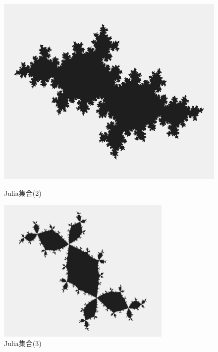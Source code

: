 \documentclass[dvipdfmx]{jsarticle}
\theoremstyle{definition}
\begin{document}
\begin{figure}[H]
    \begin{minipage}{0.49\hsize}
        \centering
        \includegraphics[scale=0.21]{figure/others/set/julia_set2.png}
        \caption{Julia集合(2)}
    \end{minipage}
    \begin{minipage}{0.49\hsize}
        \centering
        \includegraphics[width=0.75\textwidth]{figure/others/set/julia_set3.png}
        \caption{Julia集合(3)}
    \end{minipage}
\end{figure}
\end{document}
